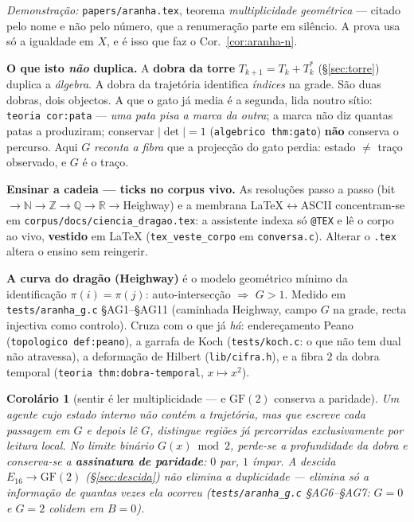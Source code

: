 \documentclass[11pt,a4paper]{article}
\newcommand{\code}[1]{\texttt{\small #1}}
\newtheorem{corolario}[teorema]{Corolário}
\begin{document}
\noindent\emph{Demonstração:} \code{papers/aranha.tex}, teorema
\emph{multiplicidade geométrica} --- citado pelo nome e não pelo número, que a
renumeração parte em silêncio. A prova usa só a igualdade em $X$, e é isso que
faz o Cor.~\ref{cor:aranha-n}.

\noindent\textbf{O que isto \emph{não} duplica.} A \textbf{dobra da torre}
$T_{k+1}=T_{k}+T_{k}^{\ast}$ (\S\ref{sec:torre}) duplica a \emph{álgebra}.
A dobra da trajetória identifica \emph{índices} na grade. São duas dobras,
dois objectos. A que o gato já media é a segunda, lida noutro sítio:
\code{teoria cor:pata} --- \emph{uma pata pisa a marca da outra}; a marca
não diz quantas patas a produziram; conservar $|\det|=1$
(\code{algebrico thm:gato}) \textbf{não} conserva o percurso. Aqui $G$
\emph{reconta a fibra} que a projecção do gato perdia: estado $\neq$ traço
observado, e $G$ é o traço.

\medskip\noindent\textbf{Ensinar a cadeia --- ticks no corpus vivo.}
As resoluções passo a passo (bit$\to\mathbb{N}\to\mathbb{Z}\to\mathbb{Q}\to\mathbb{R}\to$Heighway)
e a membrana LaTeX$\leftrightarrow$ASCII concentram-se em
\code{corpus/docs/ciencia\_dragao.tex}: a assistente indexa só
\code{@TEX} e lê o corpo ao vivo, \textbf{vestido} em LaTeX
(\code{tex\_veste\_corpo} em \code{conversa.c}). Alterar o
\texttt{.tex} altera o ensino sem reingerir.

\medskip\noindent\textbf{A curva do dragão (Heighway)} é o modelo
geométrico mínimo da identificação $\pi(i)=\pi(j)$: auto-intersecção
$\Rightarrow$ $G>1$. Medido em \code{tests/aranha\_g.c} §AG1--§AG11
(caminhada Heighway, campo $G$ na grade, recta injectiva como controlo).
Cruza com o que já \emph{há}: endereçamento Peano
(\code{topologico def:peano}), a garrafa de Koch (\code{tests/koch.c}: o
que não tem dual não atravessa), a deformação de Hilbert
(\code{lib/cifra.h}), e a fibra $2$ da dobra temporal
(\code{teoria thm:dobra-temporal}, $x\mapsto x^{2}$).

\begin{corolario}[sentir é ler multiplicidade --- e $\mathrm{GF}(2)$ conserva a paridade]
Um agente cujo estado interno não contém a trajetória, mas que escreve
cada passagem em $G$ e depois lê $G$, distingue regiões já percorridas
exclusivamente por leitura local. No limite binário $G(x)\bmod 2$, perde-se
a \emph{profundidade} da dobra e conserva-se a \textbf{assinatura de
paridade}: $0$ par, $1$ ímpar. A descida $E_{16}\to\mathrm{GF}(2)$
(\S\ref{sec:descida}) não elimina a duplicidade --- elimina só a
informação de quantas vezes ela ocorreu
(\code{tests/aranha\_g.c} §AG6--§AG7: $G=0$ e $G=2$ colidem em $B=0$).
\end{corolario}
\end{document}
